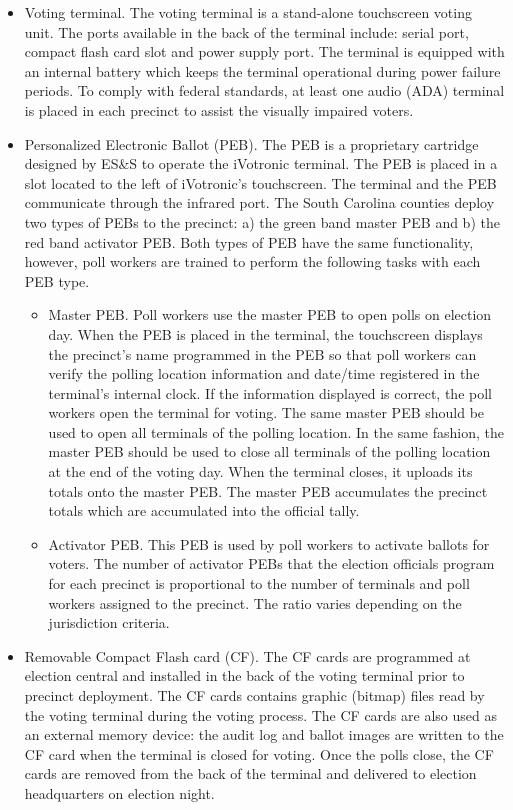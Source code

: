 \documentclass[letterpaper,twocolumn,10pt]{article}
\begin{document}
\begin{itemize} 
\item Voting terminal. The voting terminal is a stand-alone touchscreen voting  unit. The ports available in the back of the terminal include: serial port, compact flash card slot and power supply port. The terminal is equipped with an internal battery which keeps the terminal operational during power failure periods. To comply with federal standards, at least one audio (ADA) terminal is placed in each precinct to assist the visually impaired voters.

\item Personalized Electronic Ballot (PEB). The PEB is a proprietary cartridge designed by ES\&S to operate the iVotronic terminal.  The PEB is placed in a slot located to the left of iVotronic's touchscreen. The terminal and the PEB communicate through the infrared port. The South Carolina counties deploy two types of PEBs to the precinct: a) the green band master PEB and b) the red band activator PEB. Both types of PEB have the same functionality, however, poll workers are trained to perform the following tasks with each PEB type.
    \begin{itemize}
    \item Master PEB.  Poll workers use the master PEB to open polls on election day. When the PEB is placed in the terminal, the touchscreen displays the precinct's name programmed in the PEB so that poll workers can verify the polling location information and date/time registered in the terminal's internal clock. If the information displayed is correct, the poll workers open the terminal for voting. The same master PEB should be used to open all terminals of the polling location. In the same fashion, the master PEB should be used to close all terminals of the polling location at the end of the voting day. When the terminal closes, it uploads  its totals onto the master PEB. The master PEB accumulates the precinct totals which are accumulated into the official tally.
    \item Activator PEB.  This PEB is used by  poll workers to activate ballots for voters. The number of activator PEBs that the election officials program for each precinct is proportional to the number of terminals and poll workers assigned to the precinct. The ratio varies depending on the jurisdiction criteria.
    \end{itemize}
\item Removable Compact Flash card (CF). The CF cards are programmed at election central and installed in the back of the voting terminal prior to precinct deployment. The CF cards contains graphic (bitmap) files read by the voting terminal during the voting process. The CF cards are also used as an external memory device: the audit log and ballot images are written to the CF card when the terminal is closed for voting. Once the polls close, the CF cards are removed from the back of the terminal and delivered to election headquarters on election night. 


\end{itemize}
\end{document}
